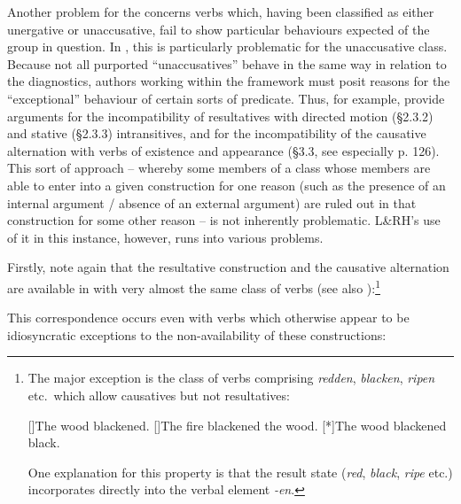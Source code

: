 \documentclass[output=paper]{langsci/langscibook}
\begin{document}
Another problem for the  concerns verbs which, having
been classified as either unergative or unaccusative, fail to show particular
behaviours expected of the group in question. In , this is particularly
problematic for the unaccusative class. Because not all purported
\enquote{unaccusatives} behave in the same way in relation to the diagnostics,
authors working within the  framework must posit reasons
for the \enquote{exceptional} behaviour of certain sorts of predicate. Thus,
for example, \citet{LevinRappaportHovav1995} provide arguments for the
incompatibility of resultatives with directed motion (§2.3.2) and stative
(§2.3.3) intransitives, and for the incompatibility of the causative
alternation with verbs of existence and appearance (§3.3, see especially p.
126). This sort of approach – whereby some members of a class whose members are
able to enter into a given construction for one reason (such as the presence of
an internal argument / absence of an external argument) are ruled out in that
construction for some other reason – is not inherently problematic. L\&RH’s
use of it in this instance, however, runs into various problems.

Firstly, note again that the resultative construction and the causative
alternation are available in  with very almost the same class of verbs
(see also \citealt{Baker2018,Baker2019}):\footnote{The major exception is the
    class of verbs comprising \emph{redden}, \emph{blacken}, \emph{ripen} etc.\
    which allow causatives but not resultatives:

\begin{exe}
    []{The wood blackened.}
    []{The fire blackened the wood.}
    [*]{The wood blackened black.}
\end{exe}

One explanation for this property is that the result state (\emph{red},
\emph{black}, \emph{ripe} etc.) incorporates directly into the verbal element
\emph{-en}.}

\ea
    \z
\z

\ea
    \z
\z
This correspondence occurs even with verbs which otherwise appear to be
idiosyncratic exceptions to the non-availability of these
constructions:
\end{document}
